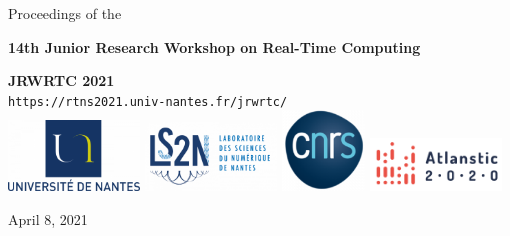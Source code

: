\documentclass[10pt]{article}
\newcommand\blankpage{%
	\null
	\thispagestyle{empty}%
	\addtocounter{page}{-1}%
	\newpage}
\begin{document}


\begin{center}
	\thispagestyle{empty}
	\LARGE{Proceedings of the}\\[-0.9ex]
	\vspace{0.1cm}
	\begin{center}

		\vspace{0.1cm}
		\textbf{\LARGE{14th Junior Research Workshop on Real-Time Computing}}
		\bigskip\par

		\textbf{\LARGE{JRWRTC 2021}}\\
		\vspace{0.3cm}
		\large{\texttt{https://rtns2021.univ-nantes.fr/jrwrtc/}}\\[-0.5ex]
		\vspace{1cm}
		\includegraphics[width=3.5cm]{imgs/logo-un-768x413.png}
		\includegraphics[width=3.5cm]{imgs/LOGOS-LS2N-e1602231001594-768x400.png}
		\includegraphics[width=2.2cm]{imgs/cnrs-3-e1612193794303.png}
		\includegraphics[width=3.5cm]{imgs/image.png}

		\vspace{1cm}
		
		\large{April 8, 2021}\\[-1ex]
		\vspace{0.6cm}
		
	\end{center}
	\medskip
\end{center}
\afterpage{\null\blankpage}
\end{document}
